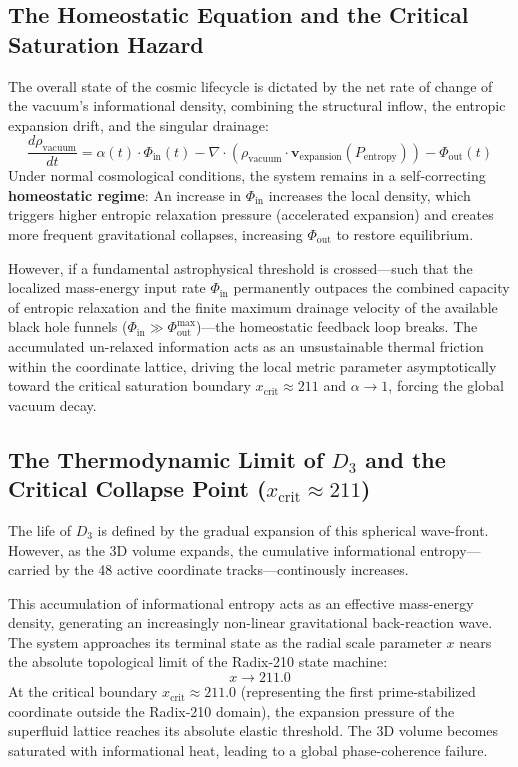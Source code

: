 \documentclass[11pt,a4paper]{article}
\theoremstyle{plain}
\theoremstyle{definition}
\theoremstyle{remark}
\begin{document}
\subsection{The Homeostatic Equation and the Critical Saturation Hazard}
The overall state of the cosmic lifecycle is dictated by the net rate of change of the vacuum's informational density, combining the structural inflow, the entropic expansion drift, and the singular drainage:
\begin{equation}
\frac{d\rho_{\text{vacuum}}}{dt} = \alpha(t) \cdot \Phi_{\text{in}}(t) - \nabla \cdot \left( \rho_{\text{vacuum}} \cdot \mathbf{v}_{\text{expansion}}(P_{\text{entropy}}) \right) - \Phi_{\text{out}}(t)
\end{equation}
Under normal cosmological conditions, the system remains in a self-correcting \textbf{homeostatic regime}: An increase in $\Phi_{\text{in}}$ increases the local density, which triggers higher entropic relaxation pressure (accelerated expansion) and creates more frequent gravitational collapses, increasing $\Phi_{\text{out}}$ to restore equilibrium.

However, if a fundamental astrophysical threshold is crossed—such that the localized mass-energy input rate $\Phi_{\text{in}}$ permanently outpaces the combined capacity of entropic relaxation and the finite maximum drainage velocity of the available black hole funnels ($\Phi_{\text{in}} \gg \Phi_{\text{out}}^{\max}$)—the homeostatic feedback loop breaks. The accumulated un-relaxed information acts as an unsustainable thermal friction within the coordinate lattice, driving the local metric parameter asymptotically toward the critical saturation boundary $x_{\text{crit}} \approx 211$ and $\alpha \to 1$, forcing the global vacuum decay.

\subsection{The Thermodynamic Limit of $D_3$ and the Critical Collapse Point ($x_{\text{crit}} \approx 211$)}
The life of $D_3$ is defined by the gradual expansion of this spherical wave-front. However, as the 3D volume expands, the cumulative informational entropy—carried by the 48 active coordinate tracks—continously increases. 

This accumulation of informational entropy acts as an effective mass-energy density, generating an increasingly non-linear gravitational back-reaction wave. The system approaches its terminal state as the radial scale parameter $x$ nears the absolute topological limit of the Radix-210 state machine:
\begin{equation}
x \to 211.0
\end{equation}
At the critical boundary $x_{\text{crit}} \approx 211.0$ (representing the first prime-stabilized coordinate outside the Radix-210 domain), the expansion pressure of the superfluid lattice reaches its absolute elastic threshold. The 3D volume becomes saturated with informational heat, leading to a global phase-coherence failure. 
\end{document}
